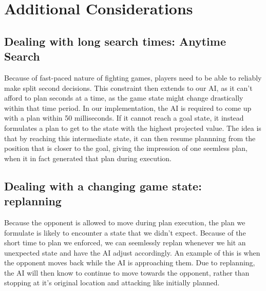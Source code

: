 



\section{Additional Considerations}

\subsection{Dealing with long search times: Anytime Search}
Because of fast-paced nature of fighting games, players need to be able to reliably make split second decisions. This constraint then extends to our AI, as it can't afford to plan seconds at a time, as the game state might change drastically within that time period. In our implementation, the AI is required to come up with a plan within 50 milliseconds. If it cannot reach a goal state, it instead formulates a plan to get to the state with the highest projected value. The idea is that by reaching this intermediate state, it can then resume plannning from the position that is closer to the goal, giving the impression of one seemless plan, when it in fact generated that plan during execution.


\subsection{Dealing with a changing game state: replanning}
Because the opponent is allowed to move during plan execution, the plan we formulate is likely to encounter a state that we didn't expect. Because of the short time to plan we enforced, we can seemlessly replan whenever we hit an unexpected state and have the AI adjust accordingly. An example of this is when the opponent moves back while the AI is approaching them. Due to replanning, the AI will then know to continue to move towards the opponent, rather than stopping at it's original location and attacking like initially planned.

